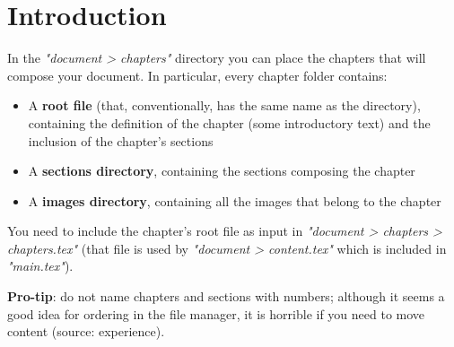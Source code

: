 \chapter{Introduction}\label{introduction}
In the \textit{"document > chapters"} directory you can place the chapters that will compose your document.
In particular, every chapter folder contains:
\begin{itemize}
    \item A \textbf{root file} (that, conventionally, has the same name as the directory), containing the definition of the chapter (some introductory text) and the inclusion of the chapter's sections
    \item A \textbf{sections directory}, containing the sections composing the chapter
    \item A \textbf{images directory}, containing all the images that belong to the chapter
\end{itemize}

You need to include the chapter's root file as input in \textit{"document > chapters > chapters.tex"} (that file is used by \textit{"document > content.tex"} which is included in \textit{"main.tex"}).

\textbf{Pro-tip}: do not name chapters and sections with numbers; although it seems a good idea for ordering in the file manager, it is horrible if you need to move content (source: experience).





